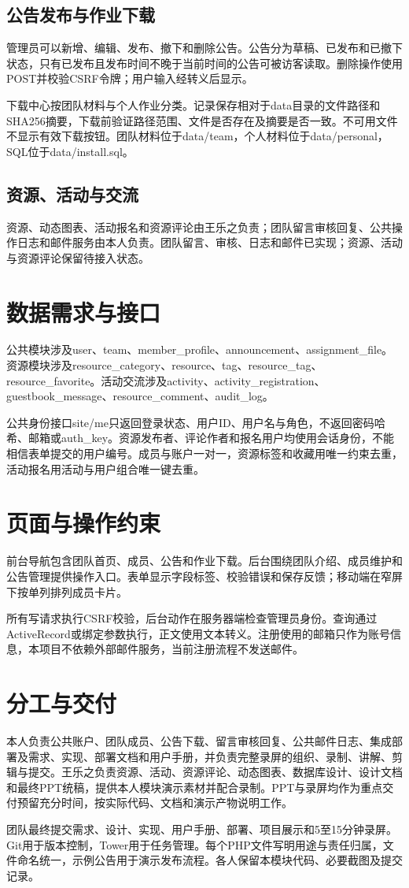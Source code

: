 \documentclass[UTF8,a4paper,11pt,fontset=windows]{ctexart}
\begin{document}
\subsection{公告发布与作业下载}
管理员可以新增、编辑、发布、撤下和删除公告。公告分为草稿、已发布和已撤下状态，只有已发布且发布时间不晚于当前时间的公告可被访客读取。删除操作使用POST并校验CSRF令牌；用户输入经转义后显示。

下载中心按团队材料与个人作业分类。记录保存相对于data目录的文件路径和SHA256摘要，下载前验证路径范围、文件是否存在及摘要是否一致。不可用文件不显示有效下载按钮。团队材料位于data/team，个人材料位于data/personal，SQL位于data/install.sql。

\subsection{资源、活动与交流}
资源、动态图表、活动报名和资源评论由王乐之负责；团队留言审核回复、公共操作日志和邮件服务由本人负责。团队留言、审核、日志和邮件已实现；资源、活动与资源评论保留待接入状态。

\section{数据需求与接口}
公共模块涉及user、team、member\_profile、announcement、assignment\_file。资源模块涉及resource\_category、resource、tag、resource\_tag、resource\_favorite。活动交流涉及activity、activity\_registration、guestbook\_message、resource\_comment、audit\_log。

公共身份接口site/me只返回登录状态、用户ID、用户名与角色，不返回密码哈希、邮箱或auth\_key。资源发布者、评论作者和报名用户均使用会话身份，不能相信表单提交的用户编号。成员与账户一对一，资源标签和收藏用唯一约束去重，活动报名用活动与用户组合唯一键去重。

\section{页面与操作约束}
前台导航包含团队首页、成员、公告和作业下载。后台围绕团队介绍、成员维护和公告管理提供操作入口。表单显示字段标签、校验错误和保存反馈；移动端在窄屏下按单列排列成员卡片。

所有写请求执行CSRF校验，后台动作在服务器端检查管理员身份。查询通过ActiveRecord或绑定参数执行，正文使用文本转义。注册使用的邮箱只作为账号信息，本项目不依赖外部邮件服务，当前注册流程不发送邮件。

\section{分工与交付}
本人负责公共账户、团队成员、公告下载、留言审核回复、公共邮件日志、集成部署及需求、实现、部署文档和用户手册，并负责完整录屏的组织、录制、讲解、剪辑与提交。王乐之负责资源、活动、资源评论、动态图表、数据库设计、设计文档和最终PPT统稿，提供本人模块演示素材并配合录制。PPT与录屏均作为重点交付预留充分时间，按实际代码、文档和演示产物说明工作。

团队最终提交需求、设计、实现、用户手册、部署、项目展示和5至15分钟录屏。Git用于版本控制，Tower用于任务管理。每个PHP文件写明用途与责任归属，文件命名统一，示例公告用于演示发布流程。各人保留本模块代码、必要截图及提交记录。
\end{document}
